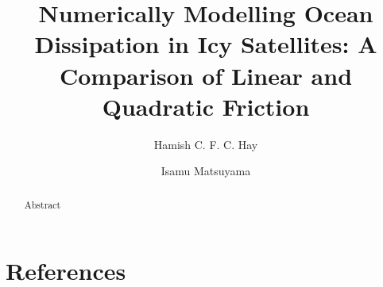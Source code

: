 \documentclass[preprint,3p,twocolumn,times,authoryear]{elsarticle}
\begin{document}
\hypersetup{
     allcolors    = MidnightBlue
}

\begin{frontmatter}

\title{Numerically Modelling Ocean Dissipation in Icy Satellites: A Comparison of Linear and Quadratic Friction}

\author[label1]{Hamish C. F. C. Hay}
\author[label1]{Isamu Matsuyama}
\address[label1]{Lunar and Planetary Laboratory, University of Arizona, Tucson, AZ 85719, United States}

\begin{abstract}

\noindent Abstract

\end{abstract}
\end{frontmatter}











\section*{References}



\end{document}

